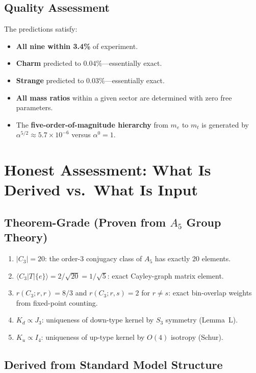 \documentclass[11pt,a4paper]{article}
\begin{document}
\subsection{Quality Assessment}

The predictions satisfy:
\begin{itemize}
\item \textbf{All nine within 3.4\%} of experiment.
\item \textbf{Charm} predicted to $0.04\%$---essentially exact.
\item \textbf{Strange} predicted to $0.03\%$---essentially exact.
\item \textbf{All mass ratios} within a given sector are determined with
      zero free parameters.
\item The \textbf{five-order-of-magnitude hierarchy} from $m_e$ to $m_t$ is generated
      by $\alpha^{5/2}\approx 5.7\times 10^{-6}$ versus $\alpha^0 = 1$.
\end{itemize}


\section{Honest Assessment: What Is Derived vs.\ What Is Input}
\label{sec:honest}

\subsection{Theorem-Grade (Proven from $A_5$ Group Theory)}

\begin{enumerate}
\item $|C_3| = 20$: the order-3 conjugacy class of $A_5$ has exactly 20 elements.
\item $\langle C_3|T|\{e\}\rangle = 2/\sqrt{20} = 1/\sqrt{5}$: exact Cayley-graph
      matrix element.
\item $r(C_3;r,r) = 8/3$ and $r(C_3;r,s) = 2$ for $r\neq s$: exact bin-overlap
      weights from fixed-point counting.
\item $K_d \propto J_3$: uniqueness of down-type kernel by $S_3$ symmetry (Lemma~L).
\item $K_u \propto I_4$: uniqueness of up-type kernel by $O(4)$ isotropy (Schur).
\end{enumerate}

\subsection{Derived from Standard Model Structure}
\end{document}
